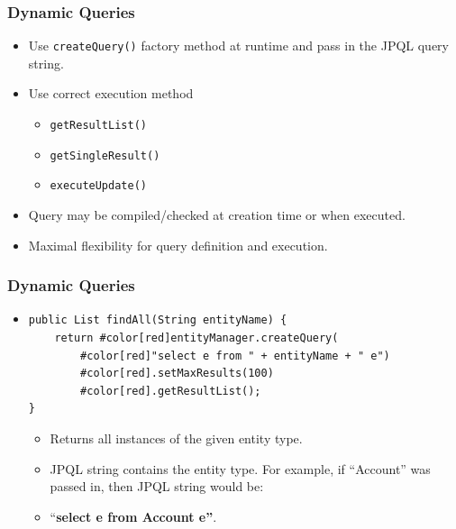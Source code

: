 \documentclass[10pt,xcolor=pdflatex]{beamer}
\begin{document}
\begin{frame}\frametitle{Dynamic Queries}
	\begin{itemize}
    	\item Use \texttt{createQuery()} factory method at runtime and pass in the JPQL query string.
    	\item Use correct execution method
          \begin{itemize}
        	\item \texttt{getResultList()}
            \item \texttt{getSingleResult()}
            \item \texttt{executeUpdate()}
            \vspace{.1cm}
          \end{itemize}
    	\item Query may be compiled/checked at creation time or when executed.
    	\item Maximal flexibility for query definition and execution.
	\end{itemize}
\end{frame}


\begin{frame}[fragile]\frametitle{Dynamic Queries}
	\begin{itemize}
	\item[]
    	\begin{Verbatim}[fontsize=\footnotesize, commandchars=\#\[\]]
public List findAll(String entityName) {
    return #color[red]entityManager.createQuery(
        #color[red]"select e from " + entityName + " e")
        #color[red].setMaxResults(100)
        #color[red].getResultList();
}
		\end{Verbatim}
      \begin{itemize}
        \item Returns all instances of the given entity type.
	    \item JPQL string contains the entity type. For example, if ``Account'' was passed in, then JPQL string would be: 
        \item[]``\textbf{select e from Account e''}.
      \end{itemize}
	\end{itemize}
\end{frame}
\end{document}
